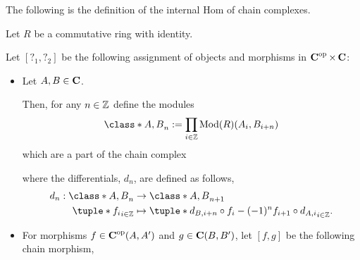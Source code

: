 The following is the definition of the internal Hom of chain complexes. 
\begin{definition}
    \label{def:internal_hom_of_chain_complexes_over_Mod(R)}
    Let \( R \) be a commutative ring with identity.
    
    Let \( [?_1, ?_2] \) be the following assignment of objects and morphisms in \( \operatorname{\mathbf{C}}^{\operatorname{op}} \times \operatorname{\mathbf{C}} \):

    \begin{itemize}
        \item {
            Let \( A, B \in \operatorname{\mathbf{C}} \).

            Then, for any \( n \in {\mathbb{Z}} \) define the modules
            \[
                \class*{A, B}_n := \prod_{i \in \Zb} \Mod(R)(A_i, B_{i + n})
            \]
            which are a part of the chain complex
            \begin{center}
            \end{center}
            where the differentials, \( d_n \), are defined as follows,
            \begin{align*}
                d_n : \class*{A, B}_n &\to \class*{A, B}_{n + 1} \\
                \tuple*{f_i}_{i \in \Zb} &\mapsto \tuple*{d_{B, i + n} \circ f_i - (-1)^n f_{i + 1} \circ d_{A, i}}_{i \in \Zb}.
            \end{align*}
        }
        \item {
            For morphisms \( f \in \operatorname{\mathbf{C}}^{\operatorname{op}}(A, A') \) and \( g \in \operatorname{\mathbf{C}}(B, B') \), let \( [f, g] \) be the following chain morphism,
            \begin{center}
\end{center}}
\end{itemize}
\end{definition}
